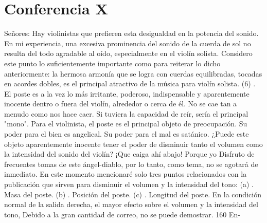 \chapter*{Conferencia X}
Señores: Hay violinistas que prefieren esta desigualdad en la potencia del sonido. En mi experiencia, una excesiva prominencia del sonido de la cuerda de sol no resulta del todo agradable al oído, especialmente en el violín solista. Considero este punto lo suficientemente importante como para reiterar lo dicho anteriormente: la hermosa armonía que se logra con cuerdas equilibradas, tocadas en acordes dobles, es el principal atractivo de la música para violín solista.
(6) . El poste es a la vez lo más irritante, poderoso, indispensable y aparentemente inocente dentro o fuera del violín, alrededor o cerca de él. No se cae tan a menudo como nos hace caer. Si tuviera la capacidad de reír, sería el principal "mono". Para el violinista, el poste es el principal objeto de preocupación. Su poder para el bien es angelical. Su poder para el mal es satánico. ¿Puede este objeto aparentemente inocente tener el poder de disminuir tanto el volumen como la intensidad del sonido del violín?
¡Que caiga ahí abajo! Porque yo
Disfruto de frecuentes tomas de este ángel-diablo, por lo tanto, como tema, no se agotará de inmediato. En este momento mencionaré solo tres puntos relacionados con la publicación que sirven para disminuir el volumen y la intensidad del tono:
(a) . Masa del poste. (b) . Posición del poste. (c) . Longitud del poste. En la condición normal de la salida derecha, el mayor efecto sobre el volumen y la intensidad del tono,
Debido a la gran cantidad de correo, no se puede demostrar. 160	En-

